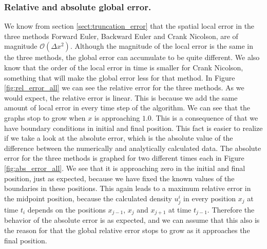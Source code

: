 \documentclass[12pt]{article}
\begin{document}
\begin{flushleft}
\subsubsection{Relative and absolute global error.}
We know from section \ref{sect:truncation_error} that the spatial local error in the three methods Forward Euler, Backward Euler and Crank Nicolson, are of magnitude $\mathcal{O}(\Delta x^2)$. Although the magnitude of the local error is the same in the three methods, the global error can accumulate to be quite different. We also know that the order of the local error in time is smaller for Crank Nicolson, something that will make the global error less for that method. In Figure \ref{fig:rel_error_all} we can see the relative error for the three methods. As we would expect, the relative error is linear. This is because we add the same amount of local error in every time step of the algorithm. We can see that the graphs stop to grow when $x$ is approaching $1.0$. This is a consequence of that we have boundary conditions in initial and final position. This fact is easier to realize if we take a look at the absolute error, which is the absolute value of the difference between the numerically and analytically calculated data. The absolute error for the three methods is graphed for two different times each in Figure \ref{fig:abs_error_all}. We see that it is approaching zero in the initial and final position, just as expected, because we have fixed the known values of the boundaries in these positions. This again leads to a maximum relative error in the midpoint position, because the calculated density $u^{i}_{j}$ in every position $x_{j}$ at time $t_i$ depends on the positions $x_{j-1}$, $x_j$ and $x_{j+1}$ at time $t_{j-1}$. Therefore the behavior of the absolute error is as expected, and we can assume that this also is the reason for that the global relative error stops to grow as it approaches the final position.\\
\vspace{5mm}

\end{flushleft}
\end{document}
